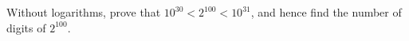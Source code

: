 Without logarithms, prove that $10^{30}<2^{100}<10^{31}$, and hence find the number of digits of $2^{100}$.
